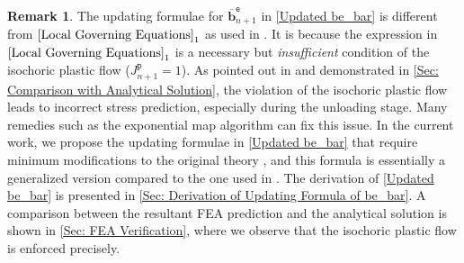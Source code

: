 \documentclass[preprint,11pt]{elsarticle}
\theoremstyle{definition}
\newtheorem{remark}{Remark}
\begin{document}
\begin{remark}
The updating formulae for $\overline{\mathbf{b}}_{n+1}^\texttt{e}$ in \eqref{Updated be_bar} is different from $\eqref{Local Governing Equations}_1$ as used in \citet{simo_framework_1988-1, simo_framework_1988}. It is because the expression in $\eqref{Local Governing Equations}_1$ is a necessary but \textit{insufficient} condition of the isochoric plastic flow ($J_{n+1}^\texttt{p} = 1$). As pointed out in \citet{wang_how_2017} and demonstrated in \ref{Sec: Comparison with Analytical Solution}, the violation of the isochoric plastic flow leads to incorrect stress prediction, especially during the unloading stage. Many remedies such as the exponential map algorithm \citep{simo_algorithms_1992, miehe_exponential_1996} can fix this issue. In the current work, we propose the updating formulae in \eqref{Updated be_bar} that require minimum modifications to the original theory \citep{simo_framework_1988-1, simo_framework_1988}, and this formula is essentially a generalized version compared to the one used in \citet{simo_associative_1992}. The derivation of \eqref{Updated be_bar} is presented in \ref{Sec: Derivation of Updating Formula of be_bar}. A comparison between the resultant FEA prediction and the analytical solution is shown in \ref{Sec: FEA Verification}, where we observe that the isochoric plastic flow is enforced precisely.
\end{remark}
\end{document}
